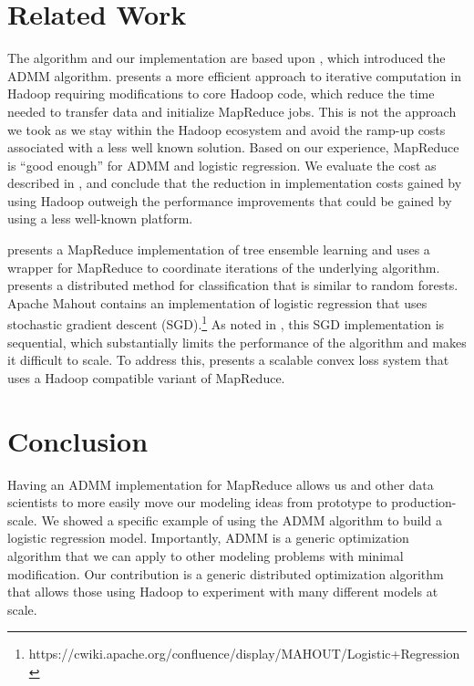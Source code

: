 \documentclass[10pt, conference, compsocconf]{IEEEtran}
\begin{document}
\section{Related Work}\label{sec:related}
The algorithm and our implementation are based upon \cite{boyd}, which introduced the ADMM algorithm.  \cite{bu2010} presents a more efficient approach to iterative computation in Hadoop requiring modifications to core Hadoop code, which reduce the time needed to transfer data and initialize MapReduce jobs.  This is not the approach we took as we stay within the Hadoop ecosystem and avoid the ramp-up costs associated with a less well known solution.  Based on our experience, MapReduce is ``good enough'' for ADMM and logistic regression.  We evaluate the cost as described in \cite{lin2012}, and conclude that the reduction in implementation costs gained by using Hadoop outweigh the performance improvements that could be gained by using a less well-known platform. 

\cite{planet} presents a MapReduce implementation of tree ensemble learning and uses a wrapper for MapReduce to coordinate iterations of the underlying algorithm.  \cite{linkolcz2012} presents a distributed method for classification that is similar to random forests. Apache Mahout contains an implementation of logistic regression that uses stochastic gradient descent (SGD).\footnote{https://cwiki.apache.org/confluence/display/MAHOUT/Logistic+Regression}  As noted in \cite{agarwal2011}, this SGD implementation is sequential, which substantially limits the performance of the algorithm and makes it difficult to scale.  To address this, \cite{agarwal2011} presents a scalable convex loss system that uses a Hadoop compatible variant of MapReduce.

\section{Conclusion}\label{sec:conc}
Having an ADMM implementation for MapReduce allows us and other data scientists to more easily move our modeling ideas from prototype to production-scale.  We showed a specific example of using the ADMM algorithm to build a logistic regression model.  Importantly, ADMM is a generic optimization algorithm that we can apply to other modeling problems with minimal modification.  Our contribution is a generic distributed optimization algorithm that allows those using Hadoop to experiment with many different models at scale.
\end{document}
